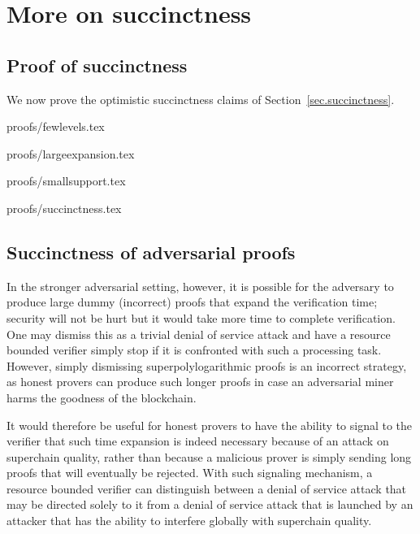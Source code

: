 \section{More on succinctness}
\label{sec.app-succinctness}

\subsection{Proof of succinctness}
We now prove the optimistic succinctness claims of
Section~\ref{sec.succinctness}.

\restateThmFewLevels
{proofs/fewlevels.tex}

\restateThmLargeExpansion
{proofs/largeexpansion.tex}

\restateThmSmallSupport
{proofs/smallsupport.tex}

\restateThmSuccinctness
{proofs/succinctness.tex}

\subsection{Succinctness of adversarial proofs}
In the stronger adversarial setting, however, it is possible for the adversary
to produce large dummy (incorrect) proofs that expand the verification time;
security will not be hurt but it would take more time to complete verification.
One may dismiss this as a trivial denial of service attack and have a resource
bounded verifier simply stop if it is confronted with such a processing task.
However, simply dismissing superpolylogarithmic proofs is an incorrect strategy,
as honest provers can produce such longer proofs in case an adversarial miner
harms the goodness of the blockchain.

It would therefore be useful for honest provers to have the ability to
signal to the verifier that such time expansion is indeed necessary because of
an attack on superchain quality, rather than because a malicious prover is
simply sending long proofs that will eventually be rejected. With such signaling
mechanism, a resource bounded verifier can distinguish between a denial of
service attack that may be directed solely to it from  a denial of service
attack that  is launched by an attacker that has the ability to  interfere
globally with superchain quality.


